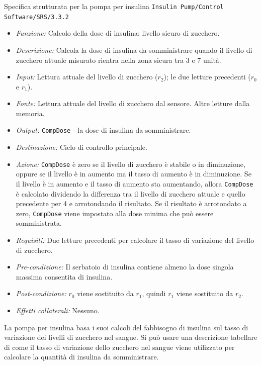 \begin{Example}{Specifica strutturata per la pompa per insulina}{}
\texttt{Insulin Pump/Control Software/SRS/3.3.2}
\begin{itemize}
    \item \textit{Funzione:} Calcolo della dose di insulina: livello sicuro di zucchero.
    \item \textit{Descrizione:} Calcola la dose di insulina da somministrare quando il livello di zucchero attuale misurato rientra nella zona sicura tra 3 e 7 unità.
    \item \textit{Input:} Lettura attuale del livello di zucchero ($r_2$); le due letture precedenti ($r_0$ e $r_1$).
    \item \textit{Fonte:} Lettura attuale del livello di zucchero dal sensore. Altre letture dalla memoria.
    \item \textit{Output:} \texttt{CompDose} - la dose di insulina da somministrare.
    \item \textit{Destinazione:} Ciclo di controllo principale.
    \item \textit{Azione:} \texttt{CompDose} è zero se il livello di zucchero è stabile o in diminuzione, oppure se il livello è in aumento ma il tasso di aumento è in diminuzione. Se il livello è in aumento e il tasso di aumento sta aumentando, allora \texttt{CompDose} è calcolato dividendo la differenza tra il livello di zucchero attuale e quello precedente per 4 e arrotondando il risultato. Se il risultato è arrotondato a zero, \texttt{CompDose} viene impostato alla dose minima che può essere somministrata.
    \item \textit{Requisiti:} Due letture precedenti per calcolare il tasso di variazione del livello di zucchero.
    \item \textit{Pre-condizione:} Il serbatoio di insulina contiene almeno la dose singola massima consentita di insulina.
    \item \textit{Post-condizione:} $r_0$ viene sostituito da $r_1$, quindi $r_1$ viene sostituito da $r_2$.
    \item \textit{Effetti collaterali:} Nessuno.
\end{itemize}

La pompa per insulina basa i suoi calcoli del fabbisogno di insulina sul tasso di variazione dei livelli di zucchero nel sangue. Si può usare una descrizione tabellare di come il tasso di variazione dello zucchero nel sangue viene utilizzato per calcolare la quantità di insulina da somministrare.\\


\end{Example}
